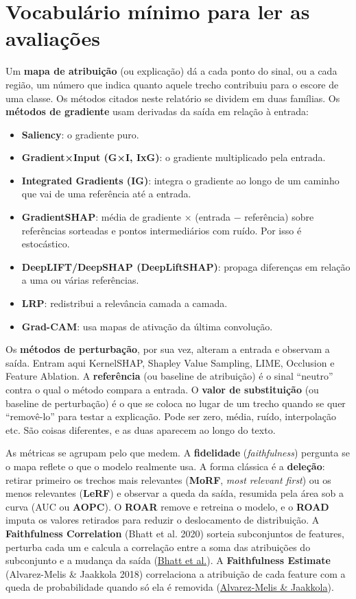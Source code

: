 \documentclass[11pt,a4paper]{article}
\begin{document}
\section{Vocabulário mínimo para ler as avaliações}

Um \textbf{mapa de atribuição} (ou explicação) dá a cada ponto do sinal, ou a cada região, um número que indica quanto aquele trecho contribuiu para o escore de uma classe. Os métodos citados neste relatório se dividem em duas famílias. Os \textbf{métodos de gradiente} usam derivadas da saída em relação à entrada:

\begin{itemize}
\item \textbf{Saliency}: o gradiente puro.
\item \textbf{Gradient×Input (G×I, IxG)}: o gradiente multiplicado pela entrada.
\item \textbf{Integrated Gradients (IG)}: integra o gradiente ao longo de um caminho que vai de uma referência até a entrada.
\item \textbf{GradientSHAP}: média de gradiente × (entrada − referência) sobre referências sorteadas e pontos intermediários com ruído. Por isso é estocástico.
\item \textbf{DeepLIFT/DeepSHAP (DeepLiftSHAP)}: propaga diferenças em relação a uma ou várias referências.
\item \textbf{LRP}: redistribui a relevância camada a camada.
\item \textbf{Grad-CAM}: usa mapas de ativação da última convolução.
\end{itemize}

Os \textbf{métodos de perturbação}, por sua vez, alteram a entrada e observam a saída. Entram aqui KernelSHAP, Shapley Value Sampling, LIME, Occlusion e Feature Ablation. A \textbf{referência} (ou baseline de atribuição) é o sinal ``neutro'' contra o qual o método compara a entrada. O \textbf{valor de substituição} (ou baseline de perturbação) é o que se coloca no lugar de um trecho quando se quer ``removê-lo'' para testar a explicação. Pode ser zero, média, ruído, interpolação etc. São coisas diferentes, e as duas aparecem ao longo do texto.

As métricas se agrupam pelo que medem. A \textbf{fidelidade} (\textit{faithfulness}) pergunta se o mapa reflete o que o modelo realmente usa. A forma clássica é a \textbf{deleção}: retirar primeiro os trechos mais relevantes (\textbf{MoRF}, \textit{most relevant first}) ou os menos relevantes (\textbf{LeRF}) e observar a queda da saída, resumida pela área sob a curva (AUC ou \textbf{AOPC}). O \textbf{ROAR} remove e retreina o modelo, e o \textbf{ROAD} imputa os valores retirados para reduzir o deslocamento de distribuição. A \textbf{Faithfulness Correlation} (Bhatt et al. 2020) sorteia subconjuntos de features, perturba cada um e calcula a correlação entre a soma das atribuições do subconjunto e a mudança da saída (\href{https://arxiv.org/abs/2005.00631}{Bhatt et al.}). A \textbf{Faithfulness Estimate} (Alvarez-Melis \& Jaakkola 2018) correlaciona a atribuição de cada feature com a queda de probabilidade quando só ela é removida (\href{https://arxiv.org/abs/1806.07538}{Alvarez-Melis \& Jaakkola}).
\end{document}
